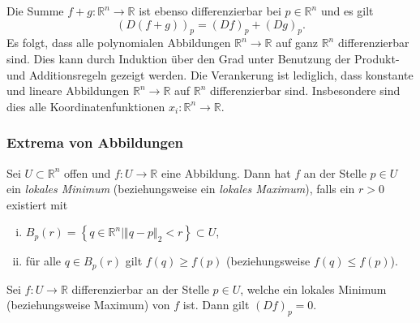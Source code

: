 \documentclass[../main.tex]{subfiles}
\begin{document}
\begin{remark}
  Die Summe $f + g \colon \mathbb{R}^n \to \mathbb{R}$
  ist ebenso differenzierbar bei $p \in \mathbb{R}^n$
  und es gilt
  \[
    {(D(f+g))}_p = {(Df)}_p + {(Dg)}_p.
  \]
  Es folgt, dass alle polynomialen Abbildungen
  $\mathbb{R}^n \to \mathbb{R}$ auf ganz
  $\mathbb{R}^n$ differenzierbar sind.
  Dies kann durch Induktion über den Grad unter
  Benutzung der Produkt- und Additionsregeln
  gezeigt werden.
  Die Verankerung ist lediglich, dass
  konstante und lineare Abbildungen
  $\mathbb{R}^n \to \mathbb{R}$ auf $\mathbb{R}^n$
  differenzierbar sind.
  Insbesondere sind dies alle Koordinatenfunktionen
  $x_i \colon \mathbb{R}^n \to \mathbb{R}$.
\end{remark}

\subsubsection*{Extrema von Abbildungen}
\begin{definition}
Sei $U \subset \mathbb{R}^n$ offen und
$f \colon U \to \mathbb{R}$ eine Abbildung.
Dann hat $f$ an der Stelle $p \in U$
ein \emph{lokales Minimum} (beziehungsweise
ein \emph{lokales Maximum}),
falls ein $r > 0$ existiert mit
\begin{enumerate}[(i)]
  \item $B_p(r) = \left\{q \in \mathbb{R}^n \mid
    \Vert q - p \Vert_2 < r\right\} \subset U$,
  \item für alle $q \in B_p(r)$ gilt
    $f(q) \geq f(p)$ (beziehungsweise $f(q) \leq f(p)$).
\end{enumerate}
\end{definition}

\begin{proposition*}
  Sei $f \colon U \to \mathbb{R}$ differenzierbar
  an der Stelle $p \in U$, welche ein lokales
  Minimum (beziehungsweise Maximum) von $f$ ist.
  Dann gilt ${(Df)}_p = 0$.
\end{proposition*}

\end{document}
